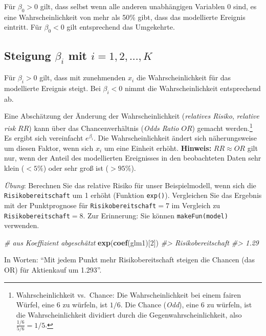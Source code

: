 \documentclass[12pt,]{book}
\newenvironment{Shaded}{\begin{snugshade}}{\end{snugshade}}
\newcommand{\KeywordTok}[1]{\textcolor[rgb]{0.13,0.29,0.53}{\textbf{{#1}}}}
\newcommand{\DecValTok}[1]{\textcolor[rgb]{0.00,0.00,0.81}{{#1}}}
\newcommand{\CommentTok}[1]{\textcolor[rgb]{0.56,0.35,0.01}{\textit{{#1}}}}
\newcommand{\NormalTok}[1]{{#1}}
\let\rmarkdownfootnote\footnote%
\def\footnote{\protect\rmarkdownfootnote}
\begin{document}
Für \(\beta_0>0\) gilt, dass selbst wenn alle anderen unabhängigen
Variablen \(0\) sind, es eine Wahrscheinlichkeit von mehr als 50\% gibt,
dass das modellierte Ereignis eintritt. Für \(\beta_0<0\) gilt
entsprechend das Umgekehrte.

\subsection{\texorpdfstring{Steigung \(\beta_i\) mit
\(i=1,2,...,K\)}{Steigung \textbackslash{}beta\_i mit i=1,2,...,K}}\label{steigung-beta_i-mit-i12...k}

Für \(\beta_i>0\) gilt, dass mit zunehmenden \(x_i\) die
Wahrscheinlichkeit für das modellierte Ereignis steigt. Bei
\(\beta_i<0\) nimmt die Wahrscheinlichkeit entsprechend ab.

Eine Abschätzung der Änderung der Wahrscheinlichkeit (\emph{relatives
Risiko}, \emph{relative risk} \(RR\)) kann über das Chancenverhältnis
(\emph{Odds Ratio} \(OR\)) gemacht werden.\footnote{Wahrscheinlichkeit
  vs.~Chance: Die Wahrscheinlichkeit bei einem fairen Würfel, eine 6 zu
  würfeln, ist \(1/6\). Die Chance (\emph{Odd}), eine 6 zu würfeln, ist
  die Wahrscheinlichkeit dividiert durch die Gegenwahrscheinlichkeit,
  also \(\frac{1/6}{5/6}=1/5\).} Es ergibt sich vereinfacht
\(e^{\beta_i}\). Die Wahrscheinlichkeit ändert sich näherungsweise um
diesen Faktor, wenn sich \(x_i\) um eine Einheit erhöht.
\textbf{Hinweis:} \(RR\approx OR\) gilt nur, wenn der Anteil des
modellierten Ereignisses in den beobachteten Daten sehr klein (\(<5\%\))
oder sehr groß ist (\(>95\%\)).

\emph{Übung}: Berechnen Sie das relative Risiko für unser
Beispielmodell, wenn sich die \texttt{Risikobereitschaft} um 1 erhöht
(Funktion \texttt{exp()}). Vergleichen Sie das Ergebnis mit der
Punktprognose für \texttt{Risikobereitschaft}\(=7\) im Vergleich zu
\texttt{Risikobereitschaft}\(=8\). Zur Erinnerung: Sie können
\texttt{makeFun(model)} verwenden.

\begin{Shaded}
\begin{Highlighting}[]
\CommentTok{# aus Koeffizient abgeschätzt}
\KeywordTok{exp}\NormalTok{(}\KeywordTok{coef}\NormalTok{(glm1)[}\DecValTok{2}\NormalTok{])}
\CommentTok{#> Risikobereitschaft }
\CommentTok{#>               1.29}
\end{Highlighting}
\end{Shaded}

In Worten: ``Mit jedem Punkt mehr Risikobereitschaft steigen die Chancen
(das OR) für Aktienkauf um 1.293''.
\end{document}

